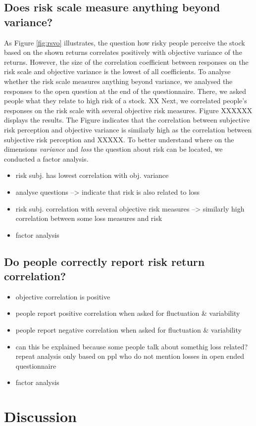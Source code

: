 \documentclass[a4paper,doc, natbib]{apa6} %
\begin{document}
\subsection{Does risk scale measure anything beyond variance?}
As Figure \ref{fig:rsvo} illustrates, the question how risky people perceive the stock based on the shown returns correlates positively with objective variance of the returns. However, the size of the correlation coefficient between responses on the risk scale and objective variance is the lowest of all coefficients. To analyse whether the risk scale measures anything beyond variance, we analysed the responses to the open question at the end of the questionnaire. There, we asked people what they relate to high risk of a stock. XX
Next, we correlated people's responses on the risk scale with several objective risk measures. Figure XXXXXX displays the results. The Figure indicates that the correlation between subjective risk perception and objective variance is similarly high as the correlation between subjective risk perception and XXXXX. To better understand where on the dimensions \textit{variance} and \textit{loss} the question about risk can be located, we conducted a factor analysis. 

\begin{itemize}
\item risk subj. has lowest correlation with obj. variance
\item analyse questions --> indicate that risk is also related to loss
\item risk subj. correlation with several objective risk measures --> similarly high correlation between some loss measures and risk
\item factor analysis
\end{itemize}


\subsection{Do people correctly report risk return correlation?}
\begin{itemize}
\item objective correlation is positive
\item people report positive correlation when asked for fluctuation & variability
\item people report negative correlation when asked for fluctuation & variability
\item can this be explained because some people talk about somethig loss related? repeat analysis only based on ppl who do not mention losses in open ended questionnaire
\item factor analysis

\end{itemize}






\section{Discussion}


\end{document}
